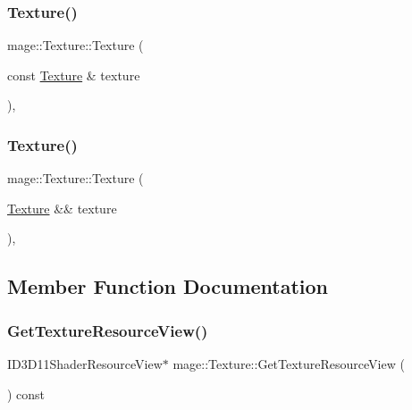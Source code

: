 \hypertarget{classmage_1_1_texture_aed9e8ab5bc3efdeb381672fd4e243ea7}{}\label{classmage_1_1_texture_aed9e8ab5bc3efdeb381672fd4e243ea7} 
\subsubsection{\texorpdfstring{Texture()}{Texture()}\hspace{0.1cm}{\footnotesize\ttfamily [2/3]}}
{\footnotesize\ttfamily mage\+::\+Texture\+::\+Texture (\begin{DoxyParamCaption}\item[{const \hyperlink{classmage_1_1_texture}{Texture} \&}]{texture }\end{DoxyParamCaption})\hspace{0.3cm}{\ttfamily [private]}, {\ttfamily [delete]}}

\hypertarget{classmage_1_1_texture_ac1381892e58871e56498f537092f827f}{}\label{classmage_1_1_texture_ac1381892e58871e56498f537092f827f} 
\subsubsection{\texorpdfstring{Texture()}{Texture()}\hspace{0.1cm}{\footnotesize\ttfamily [3/3]}}
{\footnotesize\ttfamily mage\+::\+Texture\+::\+Texture (\begin{DoxyParamCaption}\item[{\hyperlink{classmage_1_1_texture}{Texture} \&\&}]{texture }\end{DoxyParamCaption})\hspace{0.3cm}{\ttfamily [private]}, {\ttfamily [delete]}}



\subsection{Member Function Documentation}
\hypertarget{classmage_1_1_texture_a8b04efb947c49819642f86c8a16f813b}{}\label{classmage_1_1_texture_a8b04efb947c49819642f86c8a16f813b} 
\subsubsection{\texorpdfstring{Get\+Texture\+Resource\+View()}{GetTextureResourceView()}}
{\footnotesize\ttfamily I\+D3\+D11\+Shader\+Resource\+View$\ast$ mage\+::\+Texture\+::\+Get\+Texture\+Resource\+View (\begin{DoxyParamCaption}{ }\end{DoxyParamCaption}) const}

